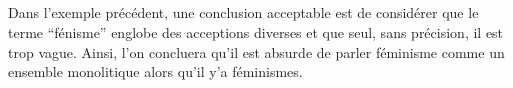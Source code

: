 \subparagraph{}
Dans l’exemple précédent, une conclusion acceptable est de considérer que le terme \enquote{fénisme} englobe des acceptions diverses et que seul, sans précision, il est trop vague. Ainsi, l’on concluera qu’il est absurde de parler  féminisme comme un ensemble monolitique alors qu’il y’a  féminismes.





